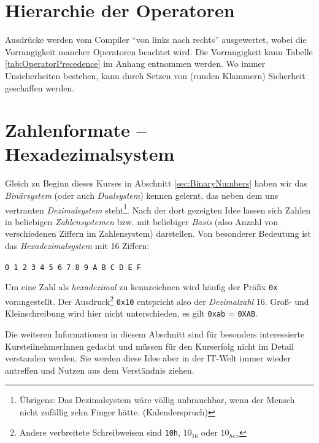 \section{Hierarchie der Operatoren} \label{sec:OperatorHierarchy}
Ausdrücke werden vom Compiler \enquote{von links nach rechts} ausgewertet, wobei die Vorrangigkeit mancher Operatoren beachtet wird. Die Vorrangigkeit kann Tabelle \ref{tab:OperatorPrecedence} im Anhang entnommen werden. Wo immer Unsicherheiten bestehen, kann durch Setzen von (runden Klammern) Sicherheit geschaffen werden.

\section{Zahlenformate -- Hexadezimalsystem} \label{sec:NumSystems}
Gleich zu Beginn dieses Kurses in Abschnitt \ref{sec:BinaryNumbers} haben wir das \emph{Binärsystem} (oder auch \emph{Dualsystem}) kennen gelernt, das neben dem uns vertrauten \emph{Dezimalsystem} steht\footnote{Übrigens: Das Dezimalsystem wäre völlig unbrauchbar, wenn der Mensch nicht zufällig zehn Finger hätte. (Kalenderspruch)}. Nach der dort gezeigten Idee lassen sich Zahlen in beliebigen \emph{Zahlensystemen} bzw. mit beliebiger \emph{Basis} (also Anzahl von verschiedenen Ziffern im Zahlensystem) darstellen. Von besonderer Bedeutung ist das \emph{Hexadezimalsystem} mit 16 Ziffern:

\begin{center}
\texttt{0 1 2 3 4 5 6 7 8 9 A B C D E F}
\end{center}

Um eine Zahl als \emph{hexadezimal} zu kennzeichnen wird häufig der Präfix \texttt{0x} vorangestellt. Der Ausdruck\footnote{Andere verbreitete Schreibweisen sind \texttt{10h}, \texttt{$10_{16}$} oder \texttt{$10_{hex}$}} \texttt{0x10} entspricht also der \emph{Dezimalzahl} 16. Groß- und Kleinschreibung wird hier nicht unterschieden, es gilt \texttt{0xab} = \texttt{0XAB}.

Die weiteren Informationen in diesem Abschnitt sind für besonders interessierte KursteilnehmerInnen gedacht und müssen für den Kurserfolg nicht im Detail verstanden werden. Sie werden diese Idee aber in der IT-Welt immer wieder antreffen und Nutzen aus dem Verständnis ziehen.

